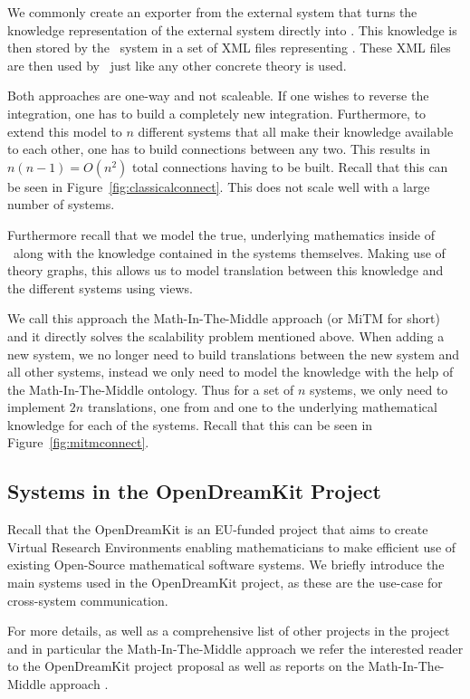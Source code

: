 We commonly create an exporter from the external system that turns the knowledge representation of the external system directly into \omdocmmt. 
This knowledge is then stored by the \mmt\ system in a set of XML files representing \omdocmmt. 
These XML files are then used by \mmt\ just like any other concrete theory is used. 

Both approaches are one-way and not scaleable. 
If one wishes to reverse the integration, one has to build a completely new integration. 
Furthermore, to extend this model to $n$ different systems that all make their knowledge available to each other, one has to build connections between any two. 
This results in $n (n - 1) = O(n^2)$ total connections having to be built. 
Recall that this can be seen in Figure~\ref{fig:classicalconnect}. 
This does not scale well with a large number of systems. 

Furthermore recall that we model the true, underlying mathematics inside of \mmt\ along with the knowledge contained in the systems themselves. Making use of theory graphs, this allows us to model translation between this knowledge and the different systems using views. 

We call this approach the Math-In-The-Middle approach (or MiTM for short) and it directly solves the scalability problem mentioned above. 
When adding a new system, we no longer need to build translations between the new system and all other systems, instead we only need to model the knowledge with the help of the Math-In-The-Middle ontology. 
Thus for a set of $n$ systems, we only need to implement $2n$ translations, one from and one to the underlying mathematical knowledge for each of the systems. 
Recall that this can be seen in Figure~\ref{fig:mitmconnect}. 

\subsection{Systems in the OpenDreamKit Project}\label{sec:mitm:systems}

Recall that the OpenDreamKit \cite{OpenDreamKit:on} is an EU-funded project that aims to create Virtual Research Environments enabling mathematicians to make efficient use of existing Open-Source mathematical software systems.
We briefly introduce the main systems used in the OpenDreamKit project, as these are the use-case for cross-system communication. 

For more details, as well as a comprehensive list of other projects in the project and in particular the Math-In-The-Middle approach we refer the interested reader to the OpenDreamKit project proposal \cite{ODKproposal:on} as well as reports on the Math-In-The-Middle approach \cite{DehKohKon:iop16}.

